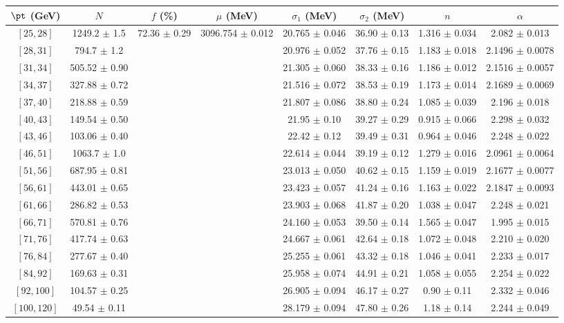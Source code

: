 \begin{tabular}{c||c|c|c|c|c|c|c}
$\pt$ (GeV) & $N$ & $f$ (\%) & $\mu$ (MeV) & $\sigma_1$ (MeV) & $\sigma_2$ (MeV) & $n$ & $\alpha$ \\
\hline
$[25, 28]$ & 1249.2 $\pm$ 1.5 & \multirow{17}{*}{72.36 $\pm$ 0.29} & \multirow{17}{*}{3096.754 $\pm$ 0.012} & 20.765 $\pm$ 0.046 & 36.90 $\pm$ 0.13 & 1.316 $\pm$ 0.034 & 2.082 $\pm$ 0.013\\
$[28, 31]$ & 794.7 $\pm$ 1.2 &  &  & 20.976 $\pm$ 0.052 & 37.76 $\pm$ 0.15 & 1.183 $\pm$ 0.018 & 2.1496 $\pm$ 0.0078\\
$[31, 34]$ & 505.52 $\pm$ 0.90 &  &  & 21.305 $\pm$ 0.060 & 38.33 $\pm$ 0.16 & 1.186 $\pm$ 0.012 & 2.1516 $\pm$ 0.0057\\
$[34, 37]$ & 327.88 $\pm$ 0.72 &  &  & 21.516 $\pm$ 0.072 & 38.53 $\pm$ 0.19 & 1.173 $\pm$ 0.014 & 2.1689 $\pm$ 0.0069\\
$[37, 40]$ & 218.88 $\pm$ 0.59 &  &  & 21.807 $\pm$ 0.086 & 38.80 $\pm$ 0.24 & 1.085 $\pm$ 0.039 & 2.196 $\pm$ 0.018\\
$[40, 43]$ & 149.54 $\pm$ 0.50 &  &  & 21.95 $\pm$ 0.10 & 39.27 $\pm$ 0.29 & 0.915 $\pm$ 0.066 & 2.298 $\pm$ 0.032\\
$[43, 46]$ & 103.06 $\pm$ 0.40 &  &  & 22.42 $\pm$ 0.12 & 39.49 $\pm$ 0.31 & 0.964 $\pm$ 0.046 & 2.248 $\pm$ 0.022\\
$[46, 51]$ & 1063.7 $\pm$ 1.0 &  &  & 22.614 $\pm$ 0.044 & 39.19 $\pm$ 0.12 & 1.279 $\pm$ 0.016 & 2.0961 $\pm$ 0.0064\\
$[51, 56]$ & 687.95 $\pm$ 0.81 &  &  & 23.013 $\pm$ 0.050 & 40.62 $\pm$ 0.15 & 1.159 $\pm$ 0.019 & 2.1677 $\pm$ 0.0077\\
$[56, 61]$ & 443.01 $\pm$ 0.65 &  &  & 23.423 $\pm$ 0.057 & 41.24 $\pm$ 0.16 & 1.163 $\pm$ 0.022 & 2.1847 $\pm$ 0.0093\\
$[61, 66]$ & 286.82 $\pm$ 0.53 &  &  & 23.903 $\pm$ 0.068 & 41.87 $\pm$ 0.20 & 1.038 $\pm$ 0.047 & 2.248 $\pm$ 0.021\\
$[66, 71]$ & 570.81 $\pm$ 0.76 &  &  & 24.160 $\pm$ 0.053 & 39.50 $\pm$ 0.14 & 1.565 $\pm$ 0.047 & 1.995 $\pm$ 0.015\\
$[71, 76]$ & 417.74 $\pm$ 0.63 &  &  & 24.667 $\pm$ 0.061 & 42.64 $\pm$ 0.18 & 1.072 $\pm$ 0.048 & 2.210 $\pm$ 0.020\\
$[76, 84]$ & 277.67 $\pm$ 0.40 &  &  & 25.255 $\pm$ 0.061 & 43.32 $\pm$ 0.18 & 1.046 $\pm$ 0.041 & 2.233 $\pm$ 0.017\\
$[84, 92]$ & 169.63 $\pm$ 0.31 &  &  & 25.958 $\pm$ 0.074 & 44.91 $\pm$ 0.21 & 1.058 $\pm$ 0.055 & 2.254 $\pm$ 0.022\\
$[92, 100]$ & 104.57 $\pm$ 0.25 &  &  & 26.905 $\pm$ 0.094 & 46.17 $\pm$ 0.27 & 0.90 $\pm$ 0.11 & 2.332 $\pm$ 0.046\\
$[100, 120]$ & 49.54 $\pm$ 0.11 &  &  & 28.179 $\pm$ 0.094 & 47.80 $\pm$ 0.26 & 1.18 $\pm$ 0.14 & 2.244 $\pm$ 0.049\\
\end{tabular}
